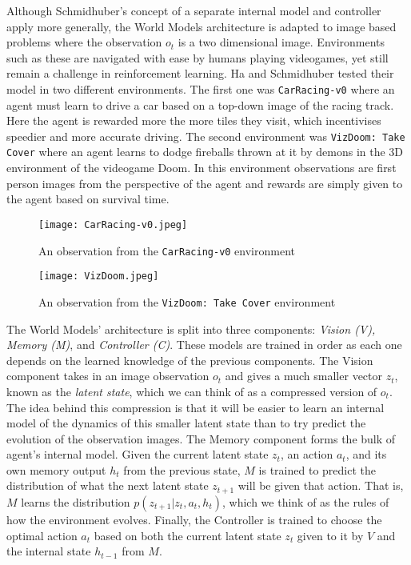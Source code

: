 \documentclass{article}
\numberwithin{figure}{section}
\theoremstyle{definition}
\begin{document}
Although Schmidhuber's concept of a separate internal model and controller apply more generally, the World Models architecture is adapted to image based problems where the observation $o_t$ is a two dimensional image.
Environments such as these are navigated with ease by humans playing videogames, yet still remain a challenge in reinforcement learning.
Ha and Schmidhuber tested their model in two different environments.
The first one was \texttt{CarRacing-v0} \citep{carRacing} where an agent must learn to drive a car based on a top-down image of the racing track.
Here the agent is rewarded more the more tiles they visit, which incentivises speedier and more accurate driving.
The second environment was \texttt{VizDoom: Take Cover} \citep{kempka2016vizdoom} where an agent learns to dodge fireballs thrown at it by demons in the 3D environment of the videogame Doom.
In this environment observations are first person images from the perspective of the agent and rewards are simply given to the agent based on survival time.

\begin{figure}[h]
  \centering
  \begin{minipage}{0.45\textwidth}
      \centering
      \texttt{[image: CarRacing-v0.jpeg]} %
      \caption{An observation from the \texttt{CarRacing-v0} environment}
  \end{minipage}\hfill
  \begin{minipage}{0.45\textwidth}
      \centering
      \texttt{[image: VizDoom.jpeg]} %
      \caption{An observation from the \texttt{VizDoom: Take Cover} environment}
  \end{minipage}
\end{figure}

The World Models' architecture is split into three components: \textit{Vision (V), Memory (M)}, and \textit{Controller (C)}.
These models are trained in order as each one depends on the learned knowledge of the previous components.
The Vision component %
takes in an image observation $o_t$ and gives a much smaller vector $z_t$, known as the \textit{latent state}, which we can think of as a compressed version of $o_t$.
The idea behind this compression is that it will be easier to learn an internal model of the dynamics of this smaller latent state than to try predict the evolution of the observation images. 
The Memory component forms the bulk of agent's internal model.
Given the current latent state $z_t$, an action $a_t$, and its own memory output $h_{t}$ from the previous state, $M$ is trained to predict the distribution of what the next latent state $z_{t+1}$ will be given that action.
That is, $M$ learns the distribution $p(z_{t+1} | z_t, a_t, h_t)$, which we think of as the rules of how the environment evolves.
Finally, the Controller is trained to choose the optimal action $a_t$ based on both the current latent state $z_t$ given to it by $V$ and the internal state $h_{t-1}$ from $M$. 
\end{document}
